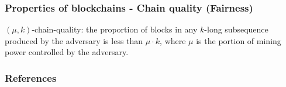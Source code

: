 \documentclass{beamer}
\begin{document}
\begin{frame}
\frametitle{Properties of blockchains - Chain quality (Fairness)}
    
$(\mu, k)$-chain-quality: the proportion of blocks in any $k$-long subsequence produced by the adversary is less than $\mu \cdot k$, where $\mu$ is the portion of mining power controlled by the adversary.

\end{frame}


\begin{frame}[allowframebreaks]
    \frametitle{References}
    
    \tiny
\end{frame}
\end{document}

